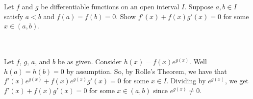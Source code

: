 Let $f$ and $g$ be differentiable functions on an open interval $I$. Suppose $a,b\in I$ satisfy $a<b$
and $f(a)=f(b)=0$. Show $f'(x)+f(x)g'(x)=0$ for some $x\in(a, b)$.\\\\

\begin{solution}\renewcommand{\qedsymbol}{}\ \\
    Let $f$, $g$, $a$, and $b$ be as given. Consider $h(x)=f(x)e^{g(x)}$. Well $h(a)=h(b)=0$ by
    assumption. So, by Rolle's Theorem, we have that $f'(x)e^{g(x)}+f(x)e^{g(x)}g'(x)=0$ for some
    $x\in I$. Dividing by $e^{g(x)}$, we get $f'(x)+f(x)g'(x)=0$ for some $x\in(a, b)$ since
    $e^{g(x)}\neq0$.

\end{solution}
